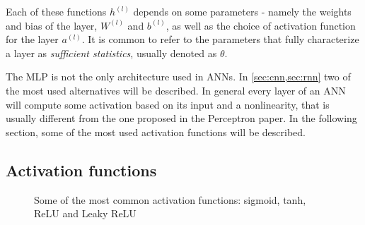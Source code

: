 \noindent Each of these functions $h^{(l)}$ depends on some parameters - namely
the weights and bias of the layer, $W^{(l)}$ and $b^{(l)}$, as well as the
choice of activation function for the layer $a^{(l)}$. It is common to refer to
the parameters that fully characterize a layer as \emph{sufficient statistics},
usually denoted as $\theta$.

The MLP is not the only architecture used in ANNs. In \autoref{sec:cnn,sec:rnn}
two of the most used alternatives will be described. In general every layer of
an ANN will compute some activation based on its input and a nonlinearity, that
is usually different from the one proposed in the Perceptron paper. In the
following section, some of the most used activation functions will be
described.

\subsection{Activation functions}\label{sec:activations}
\begin{figure}[h]
    \centering
    \caption{Some of the most common activation functions: sigmoid, tanh, ReLU
        and Leaky ReLU\label{fig:activations}}
\end{figure}

